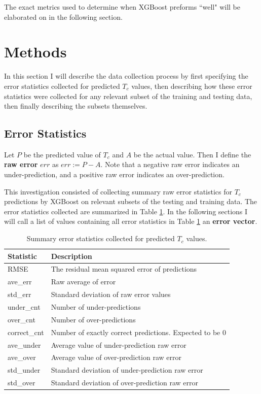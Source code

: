 \documentclass[oneside,12pt]{amsart}
\begin{document}
 The exact metrics used to determine when XGBoost preforms ``well" will be elaborated on in the following section.
 
 \section{Methods}
 
 In this section I will describe the data collection process by first specifying the error statistics collected for predicted $T_c$ values, then describing how these error statistics were collected for any relevant subset of the training and testing data, then finally describing the subsets themselves.
 
 \subsection{Error Statistics}
 
 Let $P$ be the predicted value of $T_c$ and $A$ be the actual value. Then I define the \textbf{raw error} $err$ as $err := P-A$. Note that a negative raw error indicates an under-prediction, and a positive raw error indicates an over-prediction.
 
 This investigation consisted of collecting summary raw error statistics for $T_c$ predictions by XGBoost on relevant subsets of the testing and training data. The error statistics collected are summarized in Table \ref{tab:err_stats}. In the following sections I will call a list of values containing all error statistics in Table \ref{tab:err_stats} an \textbf{error vector}.
 
 \begin{table}[]
     \centering
     \begin{tabularx}{\linewidth}{X X}
     \hline
     Statistic & Description\\
     \hline
       RMSE & The residual mean squared error of predictions \\
        ave\_err  & Raw average of error\\
        std\_err & Standard deviation of raw error values\\
        under\_cnt & Number of under-predictions\\
        over\_cnt & Number of over-predictions\\
        correct\_cnt & Number of exactly correct predictions. Expected to be 0\\
        ave\_under & Average value of under-prediction raw error\\
        ave\_over & Average value of over-prediction raw error\\
        std\_under & Standard deviation of under-prediction raw error\\
        std\_over & Standard deviation of over-prediction raw error\\
        \hline
     \end{tabularx}
     \caption{Summary error statistics collected for predicted $T_c$ values.}
     \label{tab:err_stats}
 \end{table}
 
\end{document}

